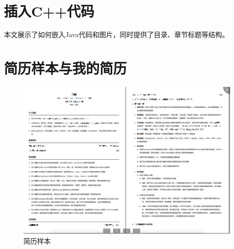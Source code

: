 \documentclass[10pt]{article}
\begin{document}
\newpage
\section{插入C++代码}
%
%
%

本文展示了如何嵌入Java代码和图片，同时提供了目录、章节标题等结构。


\newpage
\section{简历样本与我的简历}
\begin{figure}[h]
  \centering
  \begin{sideways} %
    \includegraphics[width=1.0\textwidth]{resumes_ample.jpg} %
  \end{sideways}
    \caption{简历样本}
    \label{fig:example}
  \end{figure}



\newpage
\end{document}
